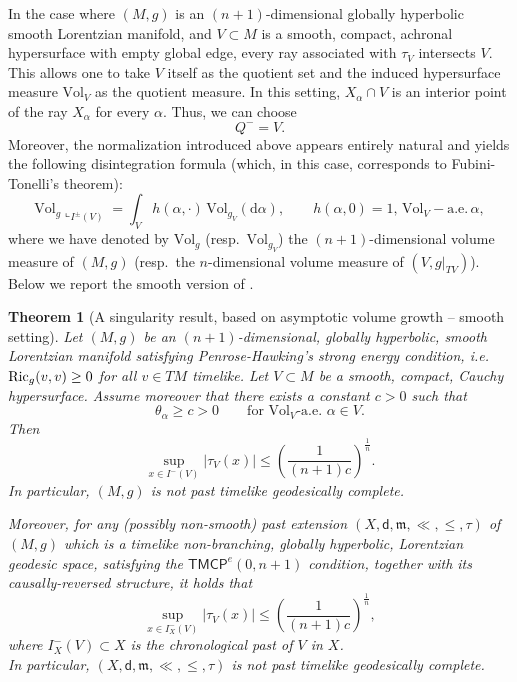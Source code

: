 \documentclass[a4paper,10pt]{article}
\newcommand{\di}{\mathrm{d}}
\newcommand{\Ric}{{\rm Ric}}
\newcommand{\vol}{\mathrm{Vol}}
\newcommand{\mm}{\mathfrak m}
\newcommand{\sfd}{\mathsf d}
\theoremstyle{plain}
\newtheorem{theorem}[lemma]{Theorem}
\theoremstyle{definition}
\numberwithin{equation}{section}
\begin{document}
In the case where \( (M,g) \) is an \( (n+1) \)-dimensional globally hyperbolic smooth Lorentzian manifold, and \( V \subset M \) is a smooth, compact, achronal hypersurface with empty global edge, every ray associated with \( \tau_V \) intersects \( V \). This allows one to take \( V \) itself as the quotient set and the induced hypersurface measure \( \vol_V \) as the quotient measure. In this setting, $X_\alpha\cap V$ is an interior point of the ray $X_\alpha$ for every $\alpha$. Thus, we can choose 
\begin{equation}\label{eq:Q-=Vsmooth}
Q^-=V.
\end{equation}
Moreover, the normalization introduced above appears entirely natural and yields the following disintegration formula (which, in this case, corresponds to Fubini-Tonelli's theorem):
% 
\begin{equation}\label{eq:DisintVolvSmooth}
\vol_g\llcorner_{I^{\pm}(V)}=\int_V h(\alpha,\cdot)\, \vol_{g_V}(\di\alpha), \qquad h(\alpha, 0) = 1, \, \vol_V-\text{a.e.} \, \alpha,
\end{equation}
%
where we have denoted by $\vol_g$ (resp.\ $\vol_{g_V}$) the $(n+1)$-dimensional volume measure of $(M,g)$ (resp.\ the  $n$-dimensional volume measure of $(V,g|_{TV})$).
Below we report the smooth version of .





\begin{theorem}[A singularity result, based on asymptotic volume growth -- smooth setting] \label{Thm:SecondsingularSmooth}
Let $(M,g)$ be an $(n+1)$-dimensional, globally hyperbolic, smooth Lorentzian manifold satisfying Penrose-Hawking's strong energy condition, i.e.\ $\Ric_g(v,v)\geq 0$ for all $v\in TM$ timelike. Let $V\subset M$ be a smooth, compact, Cauchy hypersurface.  Assume moreover that there exists a constant \( c>0 \) such that
\begin{equation*}%
\theta_\alpha \ge c >0
\qquad
\text{for \(\vol_V\)-a.e.\ \(\alpha \in V\)} .
\end{equation*}%
Then 
\begin{equation*}%
\sup_{x\in I^{-}(V)} |\tau_{V}(x)|  \leq \left(\frac{1}{(n+1)c}\right)^{\frac{1}{n}}.
\end{equation*}
In particular, $(M,g)$  is not past timelike geodesically complete.  



Moreover, for any (possibly non-smooth) past extension $(X,\sfd,\mm, \ll, \leq, \tau)$ of $(M,g)$ which is a timelike non-branching, globally hyperbolic, Lorentzian geodesic space,  satisfying  the $\mathsf{TMCP}^{e}(0,n+1)$ condition, together with its causally-reversed structure, it holds that
\begin{equation*}\label{eq:tauVleq1/cCor1}
\sup_{x\in I^{-}_X(V)} |\tau_{V}(x)|  \leq \left(\frac{1}{(n+1)c}\right)^{\frac{1}{n}},
\end{equation*}
where $I^{-}_X(V)\subset X$ is the chronological past of $V$ in $X$.
\\In particular, $(X,\sfd,\mm, \ll, \leq, \tau)$  is not past timelike geodesically complete.
%
\end{theorem}
\end{document}
